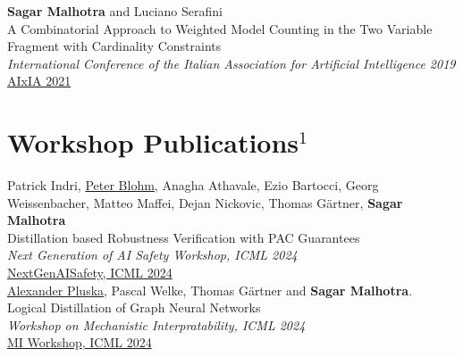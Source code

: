 \documentclass[10pt, a4paper]{article}
\newcommand{\years}[1]{\marginnote{\scriptsize #1}}
\begin{document}
\years{2021}\textbf{Sagar Malhotra} and Luciano Serafini\\
 A Combinatorial Approach to Weighted Model Counting in the Two Variable Fragment with Cardinality Constraints\\ \emph{International Conference of the Italian Association for Artificial Intelligence 2019}\\
\href{https://link.springer.com/chapter/10.1007/978-3-031-08421-8_10}{AIxIA 2021}

\newpage

\section*{Workshop Publications$^{1}$}
\noindent

\years{2024} Patrick Indri, \underline{Peter Blohm}, Anagha Athavale, Ezio Bartocci, Georg Weissenbacher, Matteo Maffei, Dejan Nickovic, Thomas Gärtner, \textbf{Sagar Malhotra}\\
Distillation based Robustness Verification with PAC Guarantees\\
\emph{Next Generation of AI Safety Workshop, ICML 2024}\\
\href{https://openreview.net/forum?id=vflefS3lmB}{NextGenAISafety, ICML 2024}\\

\years{2024}\underline{Alexander Pluska}, Pascal Welke, Thomas G{\"a}rtner and \textbf{Sagar Malhotra}.\\
Logical Distillation of Graph Neural Networks\\
\emph{Workshop on Mechanistic Interpratability, ICML 2024}\\
\href{https://openreview.net/forum?id=TfYnD2gYRO}{MI Workshop, ICML 2024}\\ \\
\end{document}
